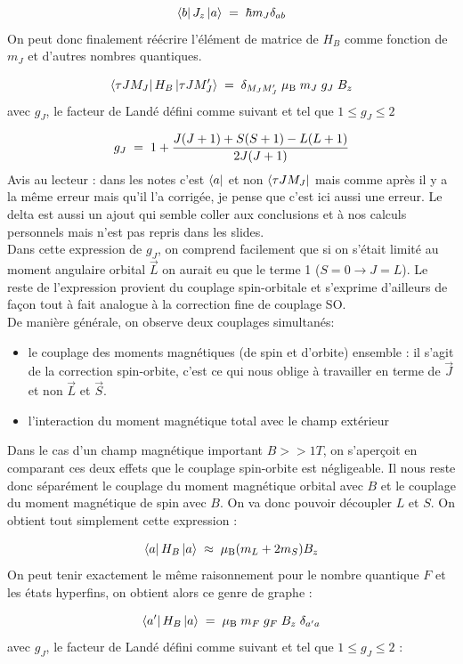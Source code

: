 \[
    \bra{b}J_z\ket{a} \; = \; \hbar m_J \delta_{ab}
\]
On peut donc finalement réécrire l'élément de matrice de $H_B$ comme fonction de $m_J$ et d'autres nombres quantiques.

\[
    \bra{\tau J M_J}H_B\ket{\tau J M'_J} \; = \; \delta_{M_J M'_J} \;\mu_\text{B} \; m_J \; g_J \; B_z
\]
avec $g_J$, le facteur de Landé défini comme suivant et tel que $1\leq g_J \leq 2$

\[
    g_J \; = \;  1 + \dfrac{J(J+1) + S(S+1) - L(L+1)}{2J(J+1)}
\]
Avis au lecteur : dans les notes c'est $\bra{a}$ et non $\bra{\tau J M_J}$ mais comme après il y a la même erreur mais qu'il l'a corrigée, je pense que c'est ici aussi une erreur. Le delta est aussi un ajout qui semble coller aux conclusions et à nos calculs personnels mais n'est pas repris dans les slides.\\

Dans cette expression de $g_J$, on comprend facilement que si on s'était limité au moment angulaire orbital $\vec{L}$ on aurait eu que le terme 1 ($S=0 \rightarrow J=L$). Le reste de l'expression provient du couplage spin-orbitale et s'exprime d'ailleurs de façon tout à fait analogue à la correction fine de couplage SO.\\

De manière générale, on observe deux couplages simultanés:
\begin{itemize}[label=$\bullet$]
    \item le couplage des moments magnétiques (de spin et d'orbite) ensemble : il s'agit de la correction spin-orbite, c'est ce qui nous oblige à travailler en terme de $\vec{J}$ et non $\vec{L}$ et $\vec{S}$.
    \item l'interaction du moment magnétique total avec le champ extérieur
\end{itemize}
Dans le cas d'un champ magnétique important $B>>1T$, on s'aperçoit en comparant ces deux effets que le couplage spin-orbite est négligeable. Il nous reste donc séparément le couplage du moment magnétique orbital avec $B$ et le couplage du moment magnétique de spin avec $B$. On va donc pouvoir découpler $L$ et $S$. On obtient tout simplement cette expression :

\[
    \bra{a}H_B\ket{a} \; \approx \; \mu_\text{B}(m_L + 2m_S)B_z
\]
On peut tenir exactement le même raisonnement pour le nombre quantique $F$ et les états hyperfins, on obtient alors ce genre de graphe :

\[
    \bra{a'}H_B\ket{a} \; = \; \mu_\text{B} \; m_F \; g_F \; B_z \;\delta_{a'a}
\]
avec $g_J$, le facteur de Landé défini comme suivant et tel que $1\leq g_J \leq 2$ :

